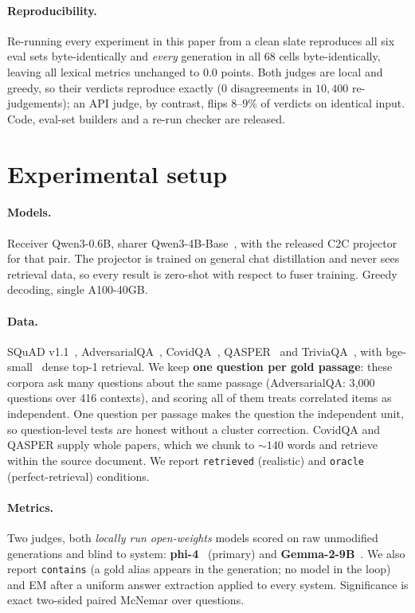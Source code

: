 \documentclass[sigconf,anonymous,review]{acmart}
\begin{document}
\paragraph{Reproducibility.} Re-running every experiment in this paper from a clean slate
reproduces all six eval sets byte-identically and \emph{every} generation in all 68 cells
byte-identically, leaving all lexical metrics unchanged to $0.0$ points. Both judges are local
and greedy, so their verdicts reproduce exactly ($0$ disagreements in $10{,}400$ re-judgements);
an API judge, by contrast, flips $8$--$9\%$ of verdicts on identical input. Code, eval-set
builders and a re-run checker are released.

\section{Experimental setup}
\label{sec:setup}

\paragraph{Models.} Receiver Qwen3-0.6B, sharer Qwen3-4B-Base~\cite{qwen3}, with the released C2C
projector for that pair. The projector is trained on general chat distillation and never sees
retrieval data, so every result is zero-shot with respect to fuser training. Greedy decoding,
single A100-40GB.

\paragraph{Data.} SQuAD v1.1~\cite{rajpurkar2016squad}, AdversarialQA~\cite{bartolo2020beat},
CovidQA~\cite{moller2020covidqa}, QASPER~\cite{dasigi2021qasper} and
TriviaQA~\cite{joshi2017triviaqa}, with bge-small~\cite{xiao2023cpack} dense top-1 retrieval. We
keep \textbf{one question per gold passage}: these corpora ask many questions about the same
passage (AdversarialQA: 3{,}000 questions over 416 contexts), and scoring all of them treats
correlated items as independent. One question per passage makes the question the independent
unit, so question-level tests are honest without a cluster correction. CovidQA and QASPER supply
whole papers, which we chunk to ${\sim}140$ words and retrieve within the source document. We
report \texttt{retrieved} (realistic) and \texttt{oracle} (perfect-retrieval) conditions.

\paragraph{Metrics.} Two judges, both \emph{locally run open-weights} models scored on raw
unmodified generations and blind to system: \textbf{phi-4}~\cite{abdin2024phi4} (primary) and
\textbf{Gemma-2-9B}~\cite{gemma2team2024}. We also report \texttt{contains} (a gold alias appears
in the generation; no model in the loop) and EM after a uniform answer extraction applied to
every system. Significance is exact two-sided paired McNemar over questions.
\end{document}
